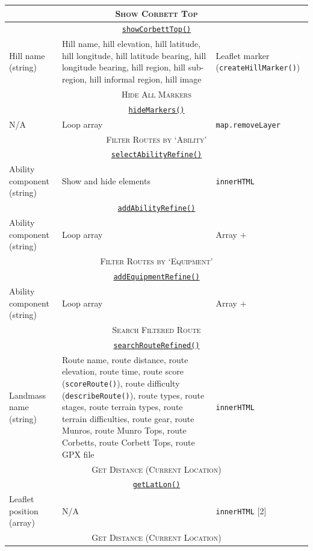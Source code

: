 \documentclass[11pt, english]{article}
\begin{document}
\begin{center}
\begin{longtable}{p{4cm}p{6cm}p{2cm}}
		\hline
		\multicolumn{3}{c}{\textsc{Show Corbett Top}}\\
		\hline
		\multicolumn{3}{c}{\underline{\texttt{showCorbettTop()}}}\\
		Hill name (string) & Hill name, hill elevation, hill latitude, hill longitude, hill latitude bearing, hill longitude bearing, hill region, hill sub-region, hill informal region, hill image & Leaflet marker (\texttt{createHillMarker()})\\
		\hline
		\multicolumn{3}{c}{\textsc{Hide All Markers}}\\
		\hline
		\multicolumn{3}{c}{\underline{\texttt{hideMarkers()}}}\\
		N/A & Loop array & \texttt{map.removeLayer}\\
		\hline
		\multicolumn{3}{c}{\textsc{Filter Routes by `Ability'}}\\
		\hline
		\multicolumn{3}{c}{\underline{\texttt{selectAbilityRefine()}}}\\
		Ability component (string) & Show and hide elements & \texttt{innerHTML}\\
		\multicolumn{3}{c}{\underline{\texttt{addAbilityRefine()}}}\\
		Ability component (string) & Loop array & Array $+$\\
		\hline
		\multicolumn{3}{c}{\textsc{Filter Routes by `Equipment'}}\\
		\hline
		\multicolumn{3}{c}{\underline{\texttt{addEquipmentRefine()}}}\\
		Ability component (string) & Loop array & Array $+$\\
		\hline
		\multicolumn{3}{c}{\textsc{Search Filtered Route}}\\
		\hline
		\multicolumn{3}{c}{\underline{\texttt{searchRouteRefined()}}}\\
		Landmass name (string) & Route name, route distance, route elevation, route time, route score (\texttt{scoreRoute()}), route difficulty (\texttt{describeRoute()}), route types, route stages, route terrain types, route terrain difficulties, route gear, route Munros, route Munro Tops, route Corbetts, route Corbett Tops, route GPX file & \texttt{innerHTML}\\
		\hline
		\multicolumn{3}{c}{\textsc{Get Distance (Current Location)}}\\
		\hline
		\multicolumn{3}{c}{\underline{\texttt{getLatLon()}}}\\
		Leaflet position (array) & N/A & \texttt{innerHTML} [2]\\
		\hline
		\multicolumn{3}{c}{\textsc{Get Distance (Current Location)}}\\

\end{longtable}
\end{center}
\end{document}
